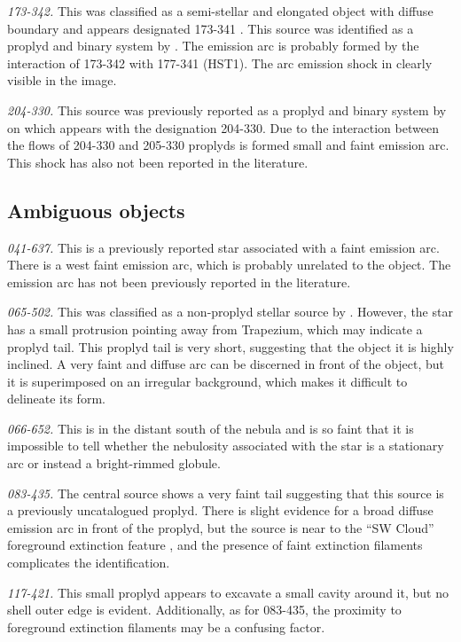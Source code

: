 \documentclass[apj, twocolumn]{aastex63}
\renewcommand\clearpage{}
\begin{document}
\textit{173-342.} This was classified as a semi-stellar and elongated
object with diffuse boundary and appears designated 173-341 \citet{ODell:1994a}.
This source was identified as a proplyd and binary system by \citet{Ricci:2008a}.
The emission arc is probably formed by the interaction of 173-342 with
177-341 (HST1). The arc emission shock in clearly visible in the image. 

\textit{204-330.} This source was previously reported as a proplyd and binary
system by \citet{Ricci:2008a} on which appears with the designation 204-330.
Due to the interaction between the flows of 204-330 and 205-330 proplyds is
formed small and faint emission arc. This shock has also not been reported
in the literature.

\clearpage
\subsection{Ambiguous objects}
\label{sec:problematic-objects}

\textit{041-637.} This is a previously reported star \citep{Da-Rio:2009a}
associated with a faint emission arc. There is a west faint emission arc,
which is probably unrelated to the object. The emission arc has not been
previously reported in the literature.

\textit{065-502.} This was classified as a non-proplyd stellar source
by \citet{ODell:1996a}. However, the star has a small protrusion
pointing away from Trapezium, which may indicate a proplyd tail. This
proplyd tail is very short, suggesting that the object it is highly
inclined.  A very faint and diffuse arc can be discerned in front of
the object, but it is superimposed on an irregular background, which
makes it difficult to delineate its form.

\textit{066-652.}  This is in the distant south of the nebula and is
so faint that it is impossible to tell whether the nebulosity
associated with the star is a stationary arc or instead a
bright-rimmed globule. 

\textit{083-435.} The central source shows a very faint tail
suggesting that this source is a previously uncatalogued proplyd.
There is slight evidence for a broad diffuse emission arc in front
of the proplyd, but the source is near to the ``SW Cloud'' foreground
extinction feature \citep{ODell:2000a}, and the presence of faint
extinction filaments complicates the identification.


\textit{117-421.} This small proplyd \citep{Ricci:2008a} appears to
excavate a small cavity around it, but no shell outer edge is
evident.  Additionally, as for 083-435, the proximity to foreground
extinction filaments may be a confusing factor. 
\end{document}

